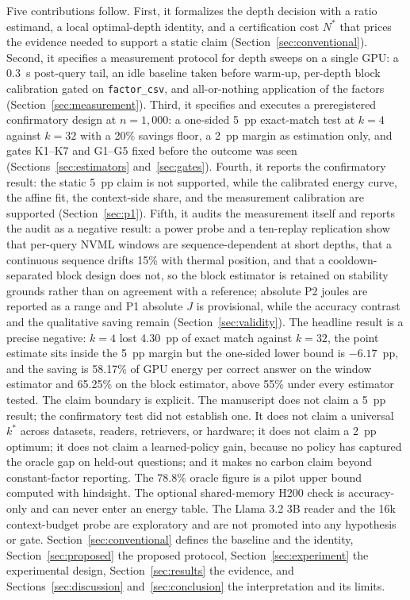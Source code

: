 \documentclass[a4paper,fleqn]{cas-sc}
\begin{document}
Five contributions follow. First, it formalizes the depth decision with a ratio estimand, a local optimal-depth identity, and a certification cost $N^{*}$ that prices the evidence needed to support a static claim (Section~\ref{sec:conventional}). Second, it specifies a measurement protocol for depth sweeps on a single GPU: a 0.3~s post-query tail, an idle baseline taken before warm-up, per-depth block calibration gated on \texttt{factor\_csv}, and all-or-nothing application of the factors (Section~\ref{sec:measurement}). Third, it specifies and executes a preregistered confirmatory design at $n=1{,}000$: a one-sided 5~pp exact-match test at $k=4$ against $k=32$ with a 20\% savings floor, a 2~pp margin as estimation only, and gates K1--K7 and G1--G5 fixed before the outcome was seen (Sections~\ref{sec:estimators} and~\ref{sec:gates}). Fourth, it reports the confirmatory result: the static 5~pp claim is not supported, while the calibrated energy curve, the affine fit, the context-side share, and the measurement calibration are supported (Section~\ref{sec:p1}). Fifth, it audits the measurement itself and reports the audit as a negative result: a power probe and a ten-replay replication show that per-query NVML windows are sequence-dependent at short depths, that a continuous sequence drifts 15\% with thermal position, and that a cooldown-separated block design does not, so the block estimator is retained on stability grounds rather than on agreement with a reference; absolute P2 joules are reported as a range and P1 absolute $J$ is provisional, while the accuracy contrast and the qualitative saving remain (Section~\ref{sec:validity}). The headline result is a precise negative: $k=4$ lost 4.30~pp of exact match against $k=32$, the point estimate sits inside the 5~pp margin but the one-sided lower bound is $-6.17$~pp, and the saving is 58.17\% of GPU energy per correct answer on the window estimator and 65.25\% on the block estimator, above 55\% under every estimator tested. The claim boundary is explicit. The manuscript does not claim a 5~pp result; the confirmatory test did not establish one. It does not claim a universal $k^{*}$ across datasets, readers, retrievers, or hardware; it does not claim a 2~pp optimum; it does not claim a learned-policy gain, because no policy has captured the oracle gap on held-out questions; and it makes no carbon claim beyond constant-factor reporting. The 78.8\% oracle figure is a pilot upper bound computed with hindsight. The optional shared-memory H200 check is accuracy-only and can never enter an energy table. The Llama 3.2 3B reader and the 16k context-budget probe are exploratory and are not promoted into any hypothesis or gate. Section~\ref{sec:conventional} defines the baseline and the identity, Section~\ref{sec:proposed} the proposed protocol, Section~\ref{sec:experiment} the experimental design, Section~\ref{sec:results} the evidence, and Sections~\ref{sec:discussion} and~\ref{sec:conclusion} the interpretation and its limits.
\end{document}

